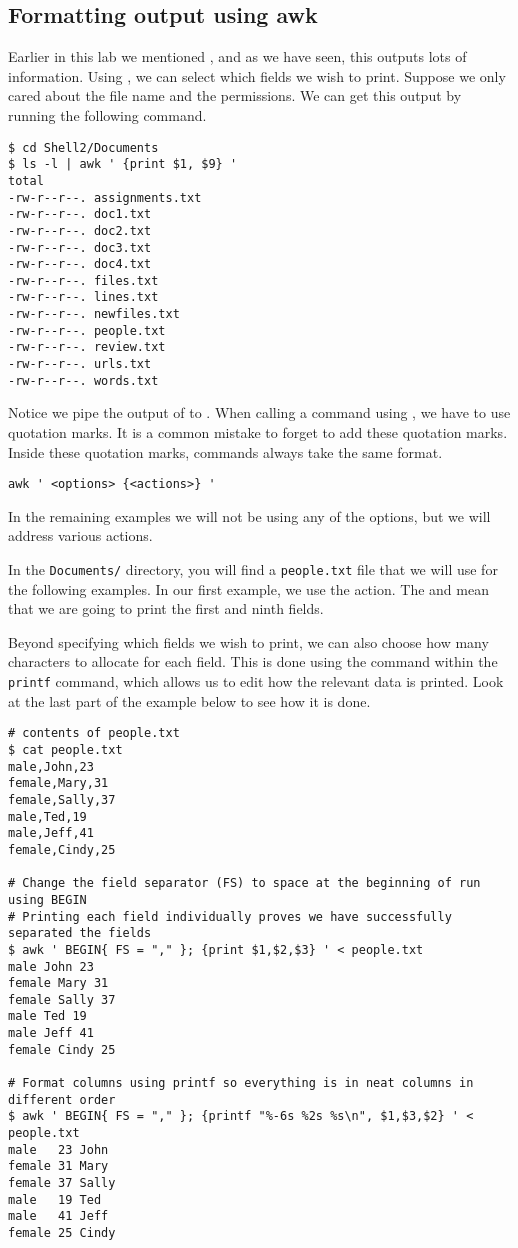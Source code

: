 \subsection*{Formatting output using awk} %

Earlier in this lab we mentioned , and as we have seen, this outputs lots of information.
Using , we can select which fields we wish to print.
Suppose we only cared about the file name and the permissions.
We can get this output by running the following command.

\begin{lstlisting}
$ cd Shell2/Documents
$ ls -l | awk ' {print $1, $9} '
total 
-rw-r--r--. assignments.txt
-rw-r--r--. doc1.txt
-rw-r--r--. doc2.txt
-rw-r--r--. doc3.txt
-rw-r--r--. doc4.txt
-rw-r--r--. files.txt
-rw-r--r--. lines.txt
-rw-r--r--. newfiles.txt
-rw-r--r--. people.txt
-rw-r--r--. review.txt
-rw-r--r--. urls.txt
-rw-r--r--. words.txt
\end{lstlisting}

Notice we pipe the output of  to .
When calling a command using , we have to use quotation marks.
It is a common mistake to forget to add these quotation marks.
Inside these quotation marks, commands always take the same format.

\begin{lstlisting}
awk ' <options> {<actions>} '
\end{lstlisting}

In the remaining examples we will not be using any of the options, but we will address various actions.

In the \texttt{Documents/} directory, you will find a \texttt{people.txt} file that we will use for the following examples.
In our first example, we use the  action.
The  and  mean that we are going to print the first and ninth fields.

Beyond specifying which fields we wish to print, we can also choose how many characters to allocate for each field.
This is done using the \li{\%} command within the \texttt{printf} command, which allows us to edit how the relevant data is printed.
Look at the last part of the example below to see how it is done.

\begin{lstlisting}
# contents of people.txt
$ cat people.txt
male,John,23
female,Mary,31
female,Sally,37
male,Ted,19
male,Jeff,41
female,Cindy,25

# Change the field separator (FS) to space at the beginning of run using BEGIN 
# Printing each field individually proves we have successfully separated the fields
$ awk ' BEGIN{ FS = "," }; {print $1,$2,$3} ' < people.txt
male John 23
female Mary 31
female Sally 37
male Ted 19
male Jeff 41
female Cindy 25

# Format columns using printf so everything is in neat columns in different order
$ awk ' BEGIN{ FS = "," }; {printf "%-6s %2s %s\n", $1,$3,$2} ' < people.txt
male   23 John
female 31 Mary
female 37 Sally
male   19 Ted
male   41 Jeff
female 25 Cindy
\end{lstlisting}

